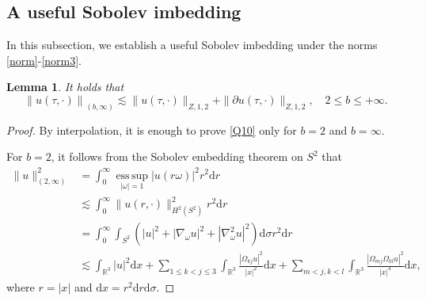 \documentclass[11pt,twoside]{article}
\newcommand{\R}{\mathbb R}
\newcommand{\p}{\partial}
\newcommand{\f}{\frac}
\theoremstyle{plain}
\newtheorem{lemma}[theorem]{Lemma}
\theoremstyle{definition}
\theoremstyle{remark}
\numberwithin{equation}{section}
\begin{document}
\subsection{A useful Sobolev imbedding}\label{sec2-1-2}

In this subsection, we establish a useful Sobolev imbedding under the norms \eqref{norm}-\eqref{norm3}.

\begin{lemma}\label{YHC-05}
It holds that
\begin{equation}\label{Q10}
\left\|u(\tau, \cdot)\right\|_{(b, \infty)}\lesssim \|u(\tau, \cdot)\|_{Z, 1,2}+\|\p u(\tau, \cdot)\|_{Z, 1,2}, \quad 2\le b\le +\infty.
\end{equation}
\end{lemma}

\begin{proof}
By interpolation, it is enough to  prove \eqref{Q10} only for $b=2$ and $b=\infty$.

For $b=2$,  it follows from the Sobolev embedding theorem on $S^2$ that
\begin{equation}\label{Q11}
\begin{aligned}
\|u\|^2_{(2, \infty)}&=\int_0^\infty  \operatorname*{ess\,sup}_{|\omega|=1}|u(r\omega)|^2r^2\mathrm{d}r\\
&\lesssim\int_0^\infty\|u(r, \cdot)\|^2_{H^2(S^2)}r^2\mathrm{d}r\\
&=\int_0^\infty\int_{S^2}\left(|u|^2+|\nabla_{\omega}u|^2+|\nabla^2_{\omega}u|^2\right)\mathrm{d}\sigma r^2\mathrm{d} r\\
&\lesssim \int_{\R^3}|u|^2\mathrm{d}x+\sum_{1\leq k<j\leq3}\int_{\R^3}\f{|\Omega_{kj}u|^2}{|x|^2}\mathrm{d}x+\sum_{m<j, k<l}\int_{\R^3}\f{|\Omega_{mj}\Omega_{kl}u|^2}{|x|^4}\mathrm{d}x,
\end{aligned}
\end{equation}
where $r=|x|$ and $\mathrm{d} x=r^2\mathrm{d}r\mathrm{d}\sigma$.


\end{proof}
\end{document}
